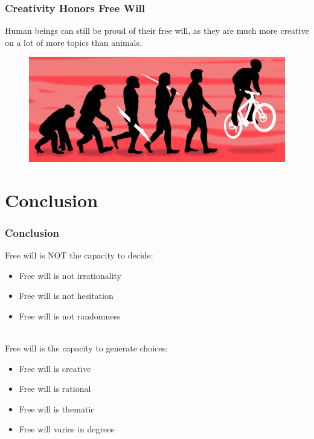 \documentclass[xcolor=dvipsnames]{beamer}
\theoremstyle{definition}
\begin{document}
\begin{frame}[fragile]
  \frametitle{Creativity Honors Free Will}

  Human beings can still be proud of their free will, as they are much more creative on a lot of more topics than animals.

  \begin{figure}
    \centering
    \includegraphics[width=1\textwidth]{images/degrees.jpg}
  \end{figure}
\end{frame}




\section{Conclusion} %
\label{sec:conclusion}

\begin{frame}[fragile]
  \frametitle{Conclusion}

  Free will is NOT the \alert{capacity to decide}:
  \begin{itemize}
  \item Free will is not irrationality
  \item Free will is not hesitation
  \item Free will is not randomness
  \end{itemize}\\[0.6cm]

  Free will is the \alert{capacity to generate choices}:
  \begin{itemize}
  \item Free will is creative
  \item Free will is rational
  \item Free will is thematic
  \item Free will varies in degrees
  \end{itemize}
\end{frame}
\end{document}
